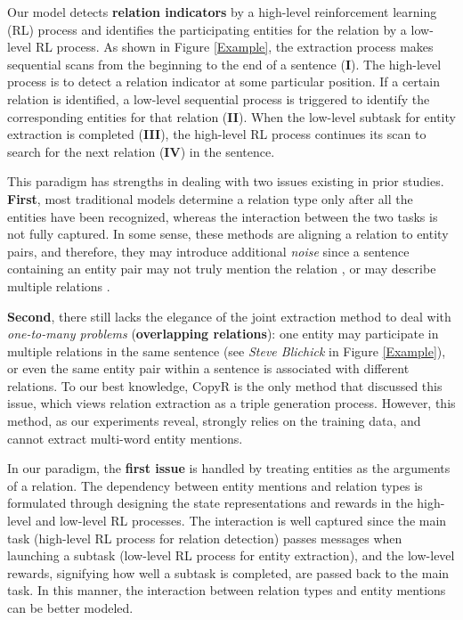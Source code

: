 \documentclass[letterpaper]{article} %
\theoremstyle{definition}
\begin{document}
Our model detects {\bf relation indicators} by a high-level reinforcement learning (RL) process and identifies the participating entities for the relation by a low-level RL process.
As shown in Figure \ref{Example},
the extraction process makes sequential scans from the beginning to the end of a sentence (\textbf{I}). The high-level process is to detect a relation indicator at some particular position.
If a certain relation is identified, a low-level sequential process is triggered to identify the corresponding entities for that relation (\textbf{II}).
When the low-level subtask for entity extraction is completed (\textbf{III}), the high-level RL process continues its scan to search for the next relation (\textbf{IV}) in the sentence.

This paradigm has strengths in dealing with two issues existing in prior studies.
\textbf{First}, most traditional models \cite{gormley2015improved,hoffmann2011knowledge,miwa2016end} determine a relation type only after all the entities have been recognized, whereas the interaction between the two tasks is not fully captured. In some sense, these methods are aligning a relation to entity pairs, and therefore, they may introduce additional \textit{noise} since a sentence containing an entity pair may not truly mention the relation \cite{zhang2013towards}, or may describe multiple relations \cite{takamatsu2012reducing}.

\textbf{Second}, there still lacks the elegance of the joint extraction method to deal with {\it one-to-many problems} (\textbf{overlapping relations}): one entity may participate in multiple relations in the same sentence  (see \textit{Steve Blichick} in Figure \ref{Example}), or even the same entity pair within a sentence is associated with different relations. %
To our best knowledge, CopyR \cite{zeng2018extracting} is the only method that discussed this issue, which views relation extraction as a triple generation process. However, this method, as our experiments reveal, strongly relies on the training data, and cannot extract multi-word entity mentions.

In our paradigm, the \textbf{first issue} is handled by treating entities as the arguments of a relation.
The dependency between entity mentions and relation types is formulated through designing the state representations and rewards in the high-level and low-level RL processes.
The interaction is well captured since the main task (high-level RL process for relation detection) passes messages when launching a subtask (low-level RL process for entity extraction), and the low-level rewards, signifying how well a subtask is completed, are passed back to the main task. In this manner, the interaction between relation types and entity mentions can be better modeled.
\end{document}
